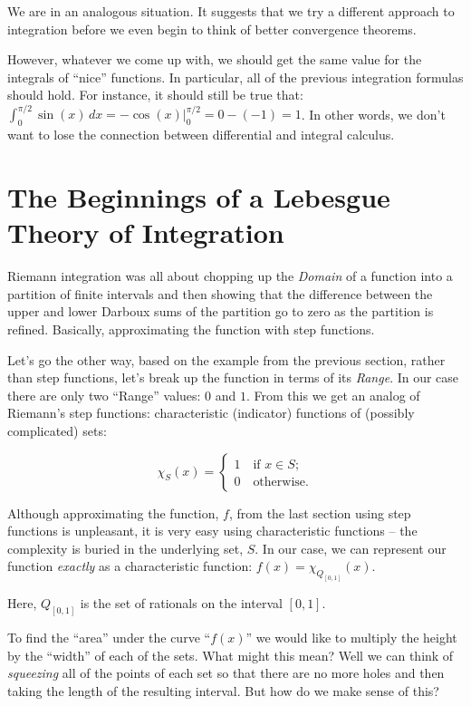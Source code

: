\documentclass{article}
\begin{document}
We are in an analogous situation. It suggests that 
we try a different approach to integration before we even
begin to think of better convergence theorems. 

However, whatever we come up with, we should get the same value for the 
integrals of ``nice'' functions. In particular, all of the previous integration 
formulas should hold. For instance, it should still be true that: 
$\int_0^{\pi / 2} \sin(x) \, dx = -\cos(x)|_{0}^{\pi / 2} = 0 - (-1) = 1$.
In other words, we don't want to lose the connection between differential and
integral calculus.


\section{The Beginnings of a Lebesgue Theory of Integration}

Riemann integration was all about chopping up the {\em Domain\/} of a function 
into a partition of finite intervals and then showing that the difference 
between the upper and lower Darboux sums of the partition 
go to zero as the partition is refined. Basically, approximating the function 
with step functions.

Let's go the other way, based on the example from the previous section, rather 
than step functions, let's break up the function in terms of its {\em Range\/}. 
In our case there are only two ``Range'' values: $0$ and $1$. From this we get an
analog of Riemann's step functions: characteristic (indicator) functions of
(possibly complicated) sets:

\[
\chi_{S}(x) = \begin{cases} 1 \quad \text{if $x \in  S$;} \\ 0 \quad \text{otherwise.} \end{cases}
\]

Although approximating the function, $f$, from the last section using step 
functions is unpleasant, it is very easy using characteristic functions -- the complexity 
is buried in the underlying set, $S$. In our case, we can represent our function {\em exactly\/}
as a characteristic function: $f(x) = \chi_{Q_{[0,1]}}(x)$.

Here, $Q_{[0,1]}$ is the set of rationals on the interval $[0, 1]$.

To find the ``area'' under the curve ``$f(x)$'' we would like to multiply the 
height by the ``width'' of each of the sets. What might this mean?
Well we can think of {\em squeezing\/} all of the points of each set so that there are 
no more holes and then taking the length of the resulting interval.
But how do we make sense of this?
\end{document}
